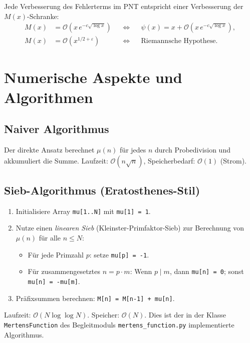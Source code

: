 \documentclass[12pt,a4paper]{amsart}
\theoremstyle{definition}
\newcommand{\BigO}{\mathcal{O}}
\begin{document}
Jede Verbesserung des Fehlerterms im PNT entspricht einer Verbesserung der
$M(x)$-Schranke:
\begin{align*}
  M(x) &= \BigO(x\,e^{-c\sqrt{\log x}}) &&\Longleftrightarrow&&
    \psi(x) = x + \BigO(x\,e^{-c\sqrt{\log x}}), \\
  M(x) &= \BigO(x^{1/2+\varepsilon}) &&\Longleftrightarrow&&
    \text{Riemannsche Hypothese.}
\end{align*}

\section{Numerische Aspekte und Algorithmen}
\label{sec:algorithmen}

\subsection{Naiver Algorithmus}

Der direkte Ansatz berechnet $\mu(n)$ für jedes $n$ durch Probedivision und
akkumuliert die Summe.  Laufzeit: $\BigO(n\sqrt{n})$, Speicherbedarf:
$\BigO(1)$ (Strom).

\subsection{Sieb-Algorithmus (Eratosthenes-Stil)}

\begin{enumerate}[label=\arabic*.]
  \item Initialisiere Array \texttt{mu[1..N]} mit \texttt{mu[1] = 1}.
  \item Nutze einen \emph{linearen Sieb} (Kleinster-Primfaktor-Sieb) zur
        Berechnung von $\mu(n)$ für alle $n \le N$:
        \begin{itemize}
          \item Für jede Primzahl $p$: setze \texttt{mu[p] = -1}.
          \item Für zusammengesetztes $n = p \cdot m$: Wenn $p \mid m$, dann
                \texttt{mu[n] = 0}; sonst \texttt{mu[n] = -mu[m]}.
        \end{itemize}
  \item Präfixsummen berechnen: \texttt{M[n] = M[n-1] + mu[n]}.
\end{enumerate}

Laufzeit: $\BigO(N \log\log N)$.  Speicher: $\BigO(N)$.  Dies ist der in der
Klasse \texttt{MertensFunction} des Begleitmoduls \texttt{mertens\_function.py}
implementierte Algorithmus.
\end{document}
